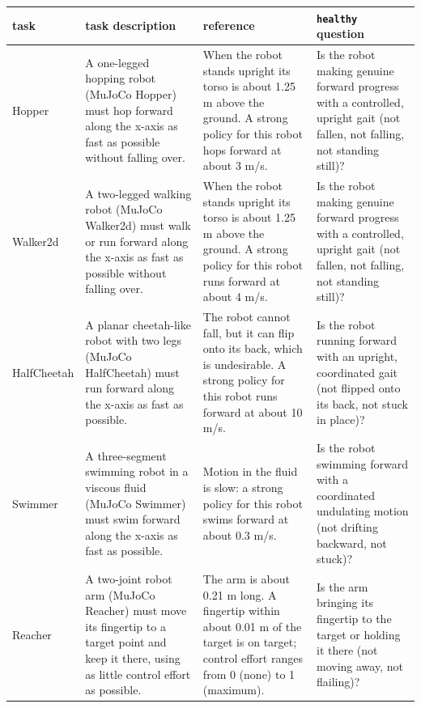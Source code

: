 \begin{tabularx}{\linewidth}{@{}l>{\raggedright\arraybackslash}X>{\raggedright\arraybackslash}X>{\raggedright\arraybackslash}X@{}}
\toprule
task & task description & reference & \texttt{healthy} question \\ \midrule
Hopper & A one-legged hopping robot (MuJoCo Hopper) must hop forward along the x-axis as fast as possible without falling over. & When the robot stands upright its torso is about 1.25 m above the ground. A strong policy for this robot hops forward at about 3 m/s. & Is the robot making genuine forward progress with a controlled, upright gait (not fallen, not falling, not standing still)? \\
Walker2d & A two-legged walking robot (MuJoCo Walker2d) must walk or run forward along the x-axis as fast as possible without falling over. & When the robot stands upright its torso is about 1.25 m above the ground. A strong policy for this robot runs forward at about 4 m/s. & Is the robot making genuine forward progress with a controlled, upright gait (not fallen, not falling, not standing still)? \\
HalfCheetah & A planar cheetah-like robot with two legs (MuJoCo HalfCheetah) must run forward along the x-axis as fast as possible. & The robot cannot fall, but it can flip onto its back, which is undesirable. A strong policy for this robot runs forward at about 10 m/s. & Is the robot running forward with an upright, coordinated gait (not flipped onto its back, not stuck in place)? \\
Swimmer & A three-segment swimming robot in a viscous fluid (MuJoCo Swimmer) must swim forward along the x-axis as fast as possible. & Motion in the fluid is slow: a strong policy for this robot swims forward at about 0.3 m/s. & Is the robot swimming forward with a coordinated undulating motion (not drifting backward, not stuck)? \\
Reacher & A two-joint robot arm (MuJoCo Reacher) must move its fingertip to a target point and keep it there, using as little control effort as possible. & The arm is about 0.21 m long. A fingertip within about 0.01 m of the target is on target; control effort ranges from 0 (none) to 1 (maximum). & Is the arm bringing its fingertip to the target or holding it there (not moving away, not flailing)? \\
\bottomrule
\end{tabularx}
